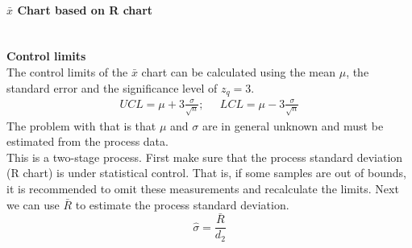\paragraph{$\bar{x}$ Chart based on R chart}\mbox{}\\
\textbf{Control limits}\\
The control limits of the $\bar{x}$ chart can be calculated using the mean $\mu$, the standard error and the significance level of $z_q = 3$.
\begin{equation}
  \begin{split}
    UCL = \mu + 3 \frac{\sigma}{\sqrt{n}}; \;\;\;\;\; LCL = \mu - 3 \frac{\sigma}{\sqrt{n}}
  \end{split}
\end{equation}
The problem with that is that $\mu$ and $\sigma$ are in general unknown and must be estimated from the process data.\\
This is a two-stage process. First make sure that the process standard deviation (R chart) is under statistical control. That is, if some samples are out of bounds, it is recommended to omit these measurements and recalculate the limits. Next we can use $\bar{R}$ to estimate the process standard deviation.\\
\begin{equation}
  \hat{\sigma} = \frac{\bar{R}}{d_2}
\end{equation}

%
%

